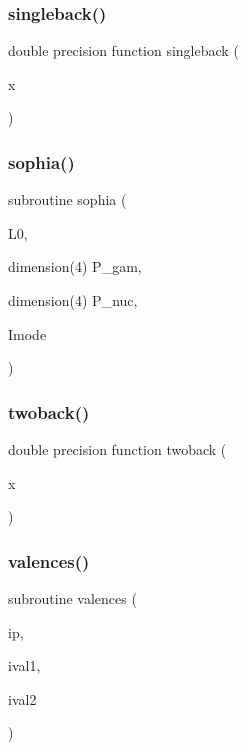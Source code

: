 \mbox{\label{sophia_8f_a3e9c601e3b3287dd92907cd27246bcbd}} 
\subsubsection{\texorpdfstring{singleback()}{singleback()}}
{\footnotesize\ttfamily double precision function singleback (\begin{DoxyParamCaption}\item[{}]{x }\end{DoxyParamCaption})}

\mbox{\label{sophia_8f_a24c50b70b50ec9f086d000cbb6b29c45}} 
\subsubsection{\texorpdfstring{sophia()}{sophia()}}
{\footnotesize\ttfamily subroutine sophia (\begin{DoxyParamCaption}\item[{}]{L0,  }\item[{dimension(4)}]{P\+\_\+gam,  }\item[{dimension(4)}]{P\+\_\+nuc,  }\item[{}]{Imode }\end{DoxyParamCaption})}

\mbox{\label{sophia_8f_a4deb51d3df1be9320d285099ba47c9f2}} 
\subsubsection{\texorpdfstring{twoback()}{twoback()}}
{\footnotesize\ttfamily double precision function twoback (\begin{DoxyParamCaption}\item[{}]{x }\end{DoxyParamCaption})}

\mbox{\label{sophia_8f_a7fd31ea25664e20b0469471449b57915}} 
\subsubsection{\texorpdfstring{valences()}{valences()}}
{\footnotesize\ttfamily subroutine valences (\begin{DoxyParamCaption}\item[{}]{ip,  }\item[{}]{ival1,  }\item[{}]{ival2 }\end{DoxyParamCaption})}

